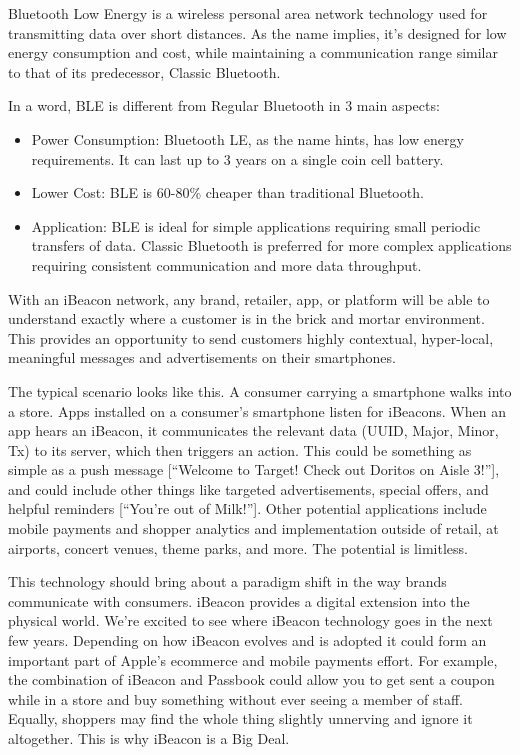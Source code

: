 \documentclass[12pt]{report}
\begin{document}
Bluetooth Low Energy is a wireless personal area network technology used for transmitting data over short distances. As the name implies, it’s designed for low energy consumption and cost, while maintaining a communication range similar to that of its predecessor, Classic Bluetooth.

In a word, BLE is different from Regular Bluetooth in 3 main aspects:

\begin{itemize}
\item Power Consumption: Bluetooth LE, as the name hints, has low energy requirements. It can last up to 3 years on a single coin cell battery.
\item Lower Cost: BLE is 60-80\% cheaper than traditional Bluetooth.
\item Application: BLE is ideal for simple applications requiring small periodic transfers of data. Classic Bluetooth is preferred for more complex applications requiring consistent communication and more data throughput.
\end{itemize}

With an iBeacon network, any brand, retailer, app, or platform will be able to understand exactly where a customer is in the brick and mortar environment. This provides an opportunity to send customers highly contextual, hyper-local, meaningful messages and advertisements on their smartphones.

The typical scenario looks like this. A consumer carrying a smartphone walks into a store. Apps installed on a consumer’s smartphone listen for iBeacons. When an app hears an iBeacon, it communicates the relevant data (UUID, Major, Minor, Tx) to its server, which then triggers an action. This could be something as simple as a push message [“Welcome to Target! Check out Doritos on Aisle 3!”], and could include other things like targeted advertisements, special offers, and helpful reminders [“You’re out of Milk!”]. Other potential applications include mobile payments and shopper analytics and implementation outside of retail, at airports, concert venues, theme parks, and more. The potential is limitless.

This technology should bring about a paradigm shift in the way brands communicate with consumers. iBeacon provides a digital extension into the physical world. We’re excited to see where iBeacon technology goes in the next few years. Depending on how iBeacon evolves and is adopted it could form an important part of Apple's ecommerce and mobile payments effort. For example, the combination of iBeacon and Passbook could allow you to get sent a coupon while in a store and buy something without ever seeing a member of staff. Equally, shoppers may find the whole thing slightly unnerving and ignore it altogether. This is why iBeacon is a Big Deal.
\end{document}
